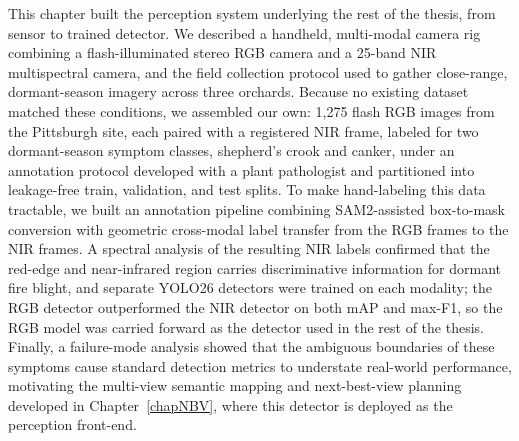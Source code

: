 This chapter built the perception system underlying the rest of the
thesis, from sensor to trained detector.
We described a handheld, multi-modal camera rig combining a
flash-illuminated stereo RGB camera and a 25-band NIR multispectral
camera, and the field collection protocol used to gather close-range,
dormant-season imagery across three orchards.
Because no existing dataset matched these conditions, we assembled our
own: 1{,}275 flash RGB images from the Pittsburgh site, each paired
with a registered NIR frame, labeled for two dormant-season symptom
classes, shepherd's crook and canker, under an annotation protocol
developed with a plant pathologist and partitioned into leakage-free
train, validation, and test splits.
To make hand-labeling this data tractable, we built an annotation
pipeline combining SAM2-assisted box-to-mask conversion with geometric
cross-modal label transfer from the RGB frames to the NIR frames.
A spectral analysis of the resulting NIR labels confirmed that the
red-edge and near-infrared region carries discriminative information
for dormant fire blight, and separate YOLO26 detectors were trained on
each modality; the RGB detector outperformed the NIR detector on both
mAP and max-F1, so the RGB model was carried forward as the detector
used in the rest of the thesis.
Finally, a failure-mode analysis showed that the ambiguous boundaries
of these symptoms cause standard detection metrics to understate
real-world performance, motivating the multi-view semantic mapping and
next-best-view planning developed in Chapter~\ref{chapNBV}, where this
detector is deployed as the perception front-end.
